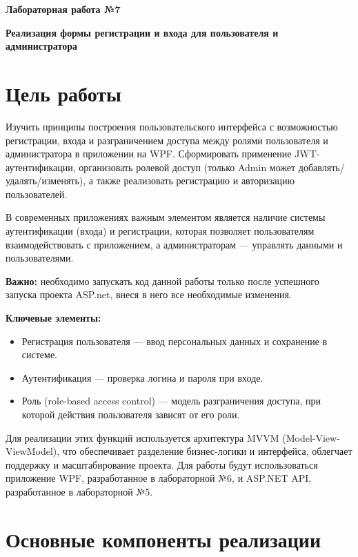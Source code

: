 \documentclass[12pt]{article}
\newcommand{\lablogo}
{
\begin{center}
    \huge{\textbf{Лабораторная работа №7}} \\
\end{center}
}
\numberwithin{listing}{section}
\numberwithin{figure}{section}
\begin{document}
\pagestyle{empty}
\lablogo
\begin{center}
	\Large{\textbf{Реализация формы регистрации и входа для пользователя и администратора}}
\end{center}
\vspace{1em}
\tableofcontents
\newpage
\listoflistings
\newpage

\pagestyle{fancy}

\section{Цель работы}
Изучить принципы построения пользовательского интерфейса с возможностью регистрации, входа и разграничением доступа между ролями пользователя и администратора в приложении на WPF. Сформировать применение JWT-аутентификации, организовать ролевой доступ (только Admin может добавлять/удалять/изменять), а также реализовать регистрацию и авторизацию пользователей.

В современных приложениях важным элементом является наличие системы аутентификации (входа) и регистрации, которая позволяет пользователям взаимодействовать с приложением, а администраторам — управлять данными и пользователями.

\noindent\textcolor{CtpRed}{\textbf{Важно:}} необходимо запускать код данной работы только после успешного запуска проекта ASP.net, внеся в него все необходимые изменения.

\textbf{Ключевые элементы:}
\begin{itemize}
	\item Регистрация пользователя — ввод персональных данных и сохранение в системе.
	\item Аутентификация — проверка логина и пароля при входе.
	\item Роль (role-based access control) — модель разграничения доступа, при которой действия пользователя зависят от его роли.
\end{itemize}
Для реализации этих функций используется архитектура MVVM (Model-View-ViewModel), что обеспечивает разделение бизнес-логики и интерфейса, облегчает поддержку и масштабирование проекта.
Для работы будут использоваться приложение WPF, разработанное в лабораторной №6, и ASP.NET API, разработанное в лабораторной №5.

\newpage

\section{Основные компоненты реализации}
\end{document}
